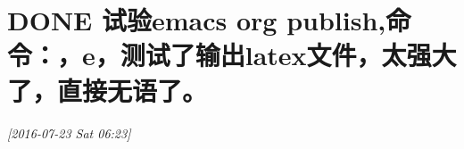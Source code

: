 \documentclass[11pt]{ctexart}
\author{mac}
\date{\today}
\title{}
\begin{document}
\tableofcontents

\section{{\bfseries\sffamily DONE} 试验emacs org publish,命令：，e，测试了输出latex文件，太强大了，直接无语了。}
\label{sec:orgheadline1}
\textit{[2016-07-23 Sat 06:23]}
\end{document}

